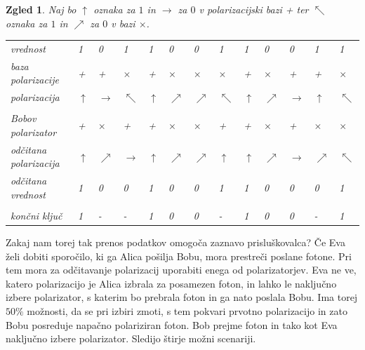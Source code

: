 \documentclass[A4paper, 11pt]{article}
\newtheorem{zgled}{Zgled}
\begin{document}
\begin{zgled}
Naj bo $\uparrow$ oznaka za $1$ in $\rightarrow$ za $0$ v polarizacijski bazi + ter $\nwarrow$ oznaka za $1$ in $\nearrow$ za $0$ v bazi $\times$.


\begin{center}
\begin{tabular}{ l m{0.3 cm} m{0.3 cm} m{0.3 cm} m{0.3 cm} m{0.3 cm} m{0.3 cm} m{0.3 cm} m{0.3 cm} m{0.3 cm} m{0.3 cm} m{0.3 cm} m{0.3 cm}}
vrednost & 1 & 0 & 1 & 1 & 0 & 0 & 1 & 1 & 0 & 0 & 1 & 1 \\
baza polarizacije & + & + & $\times$ & + & $\times$ & $\times$ & $\times$ & + & $\times$ & + & + & $\times$\\
polarizacija & $\uparrow$ & $\rightarrow$ & $\nwarrow$ & $\uparrow$ & $\nearrow$ & $\nearrow$ & $\nwarrow$  & $\uparrow$ & $\nearrow$ & $\rightarrow$ & $\uparrow$ & $\nwarrow$\\
\\
Bobov polarizator & + & $\times$ & + & + & $\times$ & $\times$ & + & + & $\times$ & + & $\times$ & $\times$\\
odčitana polarizacija & $\uparrow$ & $\nearrow$ & $\rightarrow$ & $\uparrow$ & $\nearrow$  & $\nearrow$ & $\uparrow$ & $\uparrow$ & $\nearrow$ & $\rightarrow$ & $\nearrow$ & $\nwarrow$\\
odčitana vrednost & 1 & 0 & 0 & 1 & 0 & 0 & 1 & 1 & 0 & 0 & 0 & 1\\
\\
končni ključ & 1 & - & - & 1 & 0 & 0 & - & 1 & 0 & 0 & - & 1\\
\end{tabular}
\end{center}

\end{zgled}

Zakaj nam torej tak prenos podatkov omogoča zaznavo prisluškovalca?
Če Eva želi dobiti sporočilo, ki ga Alica pošilja Bobu, mora prestreči poslane fotone. Pri tem mora za odčitavanje polarizacij uporabiti enega od polarizatorjev. Eva ne ve, katero polarizacijo je Alica izbrala za posamezen foton, in lahko le naključno izbere polarizator, s katerim bo prebrala foton in ga nato poslala Bobu. Ima torej $50\%$ možnosti, da se pri izbiri zmoti, s tem pokvari prvotno polarizacijo in zato Bobu posreduje napačno polariziran foton. Bob prejme foton in tako kot Eva naključno izbere polarizator. Sledijo štirje možni scenariji.
\end{document}
